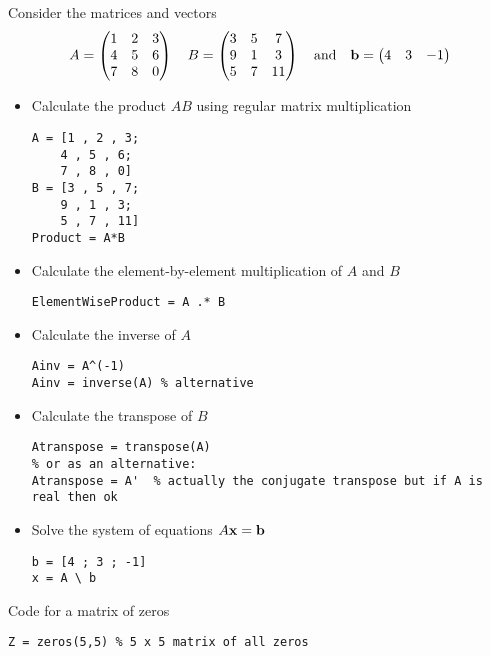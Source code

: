 \begin{example}
    Consider the matrices and vectors
    \[ A = \begin{pmatrix} 1 & 2 & 3 \\ 4 & 5 & 6 \\ 7 & 8 & 0 \end{pmatrix} \quad B =
            \begin{pmatrix} 3 & 5 & 7 \\ 9 & 1 & 3 \\ 5 & 7 & 11 \end{pmatrix} \quad
                \text{and} \quad {\bf b} = \begin{pmatrix} 4 & 3 & -1 \end{pmatrix} \]
    \begin{itemize}
        \item Calculate the product $AB$ using regular matrix multiplication
\begin{lstlisting}
A = [1 , 2 , 3; 
    4 , 5 , 6;
    7 , 8 , 0]
B = [3 , 5 , 7;
    9 , 1 , 3;
    5 , 7 , 11]
Product = A*B
\end{lstlisting}
        \item Calculate the element-by-element multiplication of $A$ and $B$
\begin{lstlisting}
ElementWiseProduct = A .* B
\end{lstlisting}
        \item Calculate the inverse of $A$
\begin{lstlisting}            
Ainv = A^(-1)
Ainv = inverse(A) % alternative
\end{lstlisting}            
        \item Calculate the transpose of $B$
\begin{lstlisting}
Atranspose = transpose(A)
% or as an alternative: 
Atranspose = A'  % actually the conjugate transpose but if A is real then ok
\end{lstlisting}
        \item Solve the system of equations $A{\bf x} = {\bf b}$
\begin{lstlisting}
b = [4 ; 3 ; -1]
x = A \ b
\end{lstlisting}
    \end{itemize}
\end{example}

\begin{example}
    Code for a matrix of zeros
\begin{lstlisting}
Z = zeros(5,5) % 5 x 5 matrix of all zeros
\end{lstlisting}
\end{example}

